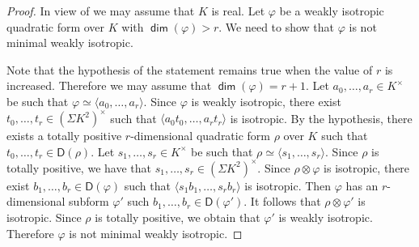 \documentclass[10pt,a4paper]{amsart}
\newcommand{\D}{\mathsf{D}}
\renewcommand{\dim}{\operatorname{\mathsf{dim}}}
\newcommand{\la}{\langle}
\newcommand{\mg}[1]{{#1}^{\times}}
\newcommand{\ra}{\rangle}
\newcommand{\vf}{\varphi}
\begin{document}
\begin{proof}
In view of  we may assume that $K$ is real.
Let $\vf$ be a weakly isotropic quadratic form over $K$ with $\dim(\vf)>r$. 
We need to show that $\vf$ is not minimal weakly isotropic.

Note that the hypothesis of the statement remains true when the value of $r$ is increased.
Therefore we may assume that $\dim(\vf)=r+1$.
Let $a_0,\dots,a_r\in\mg{K}$ be such that $\vf\simeq \la a_0,\dots,a_r\ra$.
Since $\vf$ is weakly isotropic, there exist $t_0,\dots,t_r\in\mg{(\mathsf{\Sigma}K^2)}$ such that $\la a_0t_0,\dots,a_rt_r\ra$ is isotropic.
By the hypothesis, there exists a totally positive $r$-dimensional quadratic form $\rho$ over $K$ such that $t_0,\dots,t_r\in\D(\rho)$.
Let $s_1,\dots,s_r\in\mg{K}$ be such that $\rho\simeq \la s_1,\dots,s_r\ra$.
Since $\rho$ is totally positive, we have that $s_1,\dots,s_r\in\mg{(\mathsf{\Sigma}K^2)}$.
Since $\rho\otimes\vf$ is isotropic, there exist $b_1,\dots,b_r\in\D(\vf)$ such that $\la s_1b_1,\dots,s_rb_r\ra$ is isotropic.
Then $\vf$ has an $r$-dimensional subform $\vf'$ such $b_1,\dots,b_r\in\D(\vf')$.
It follows that $\rho\otimes\vf'$ is isotropic.
Since $\rho$ is totally positive, we obtain that $\vf'$ is weakly isotropic.
Therefore $\vf$ is not minimal weakly isotropic.
\end{proof}
\end{document}
